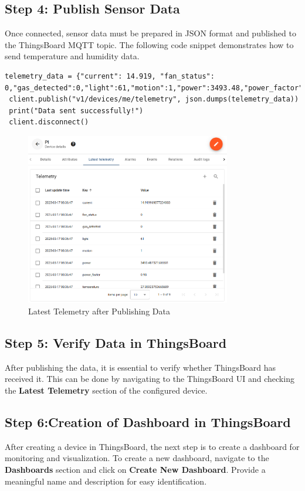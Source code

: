 \documentclass[a4paper,12pt]{report}
\begin{document}
 \subsection{Step 4: Publish Sensor Data}
 Once connected, sensor data must be prepared in JSON format and published to the ThingsBoard MQTT topic. The following code snippet demonstrates how to send temperature and humidity data.
 
 \begin{lstlisting}[caption={Sending Telemetry Response in JSON}]
 telemetry_data = {"current": 14.919, "fan_status": 0,"gas_detected":0,"light":61,"motion":1,"power":3493.48,"power_factor":0.98,"temperature":27.85}
 client.publish("v1/devices/me/telemetry", json.dumps(telemetry_data))
 print("Data sent successfully!")
 client.disconnect()
 \end{lstlisting}

 \begin{figure}[H]
    \centering
    \includegraphics[width=0.8\textwidth]{device Details.PNG}
    \caption{Latest Telemetry after Publishing Data}
 \end{figure}
 
 \subsection{Step 5: Verify Data in ThingsBoard}
 After publishing the data, it is essential to verify whether ThingsBoard has received it. This can be done by navigating to the ThingsBoard UI and checking the \textbf{Latest Telemetry} section of the configured device.

 \subsection{Step 6:Creation of Dashboard in ThingsBoard}
 After creating a device in ThingsBoard, the next step is to create a dashboard for monitoring and visualization. To create a new dashboard, navigate to the \textbf{Dashboards} section and click on \textbf{Create New Dashboard}. Provide a meaningful name and description for easy identification.
\end{document}
